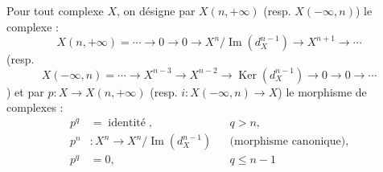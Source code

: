 Pour tout complexe $X$, on désigne par $X(n,+\infty)$ (resp.
$X(-\infty,n)$) le complexe :
\[
X(n,+\infty)=\cdots\longrightarrow0\longrightarrow0
\longrightarrow X^n/\operatorname{Im}(d_X^{n-1})
\longrightarrow X^{n+1}\longrightarrow\cdots
\]
(resp.
\[
X(-\infty,n)=\cdots\longrightarrow X^{n-3}\longrightarrow X^{n-2}
\longrightarrow\operatorname{Ker}(d_X^{n-1})
\longrightarrow0\longrightarrow0\longrightarrow\cdots
\])
et par $p\colon X\longrightarrow X(n,+\infty)$ (resp.
$i\colon X(-\infty,n)\longrightarrow X$) le morphisme de complexes :
\[
\begin{aligned}
p^q&=\operatorname{identité},&&q>n,\\
p^n&\colon X^n\longrightarrow X^n/\operatorname{Im}(d_X^{n-1})
  &&\text{(morphisme canonique)},\\
p^q&=0,&&q\leq n-1
\end{aligned}
\]
\endgroup
